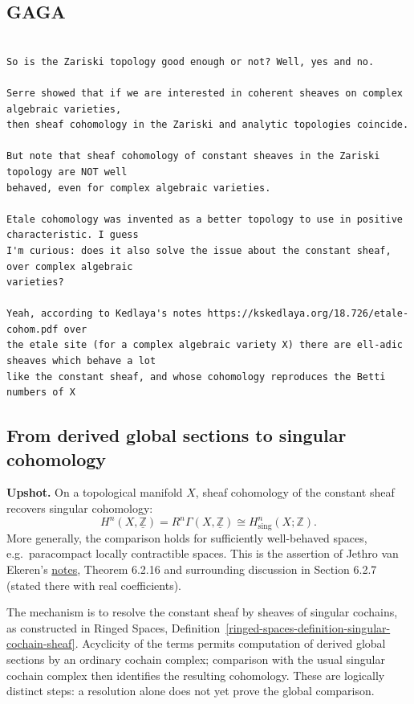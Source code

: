 \subsection{GAGA}
\label{subsection-jethro-cech-9}
\begin{Verbatim}[fontsize=\footnotesize]

So is the Zariski topology good enough or not? Well, yes and no.

Serre showed that if we are interested in coherent sheaves on complex algebraic varieties,
then sheaf cohomology in the Zariski and analytic topologies coincide.

But note that sheaf cohomology of constant sheaves in the Zariski topology are NOT well
behaved, even for complex algebraic varieties.

Etale cohomology was invented as a better topology to use in positive characteristic. I guess
I'm curious: does it also solve the issue about the constant sheaf, over complex algebraic
varieties?

Yeah, according to Kedlaya's notes https://kskedlaya.org/18.726/etale-cohom.pdf over
the etale site (for a complex algebraic variety X) there are ell-adic sheaves which behave a lot
like the constant sheaf, and whose cohomology reproduces the Betti numbers of X

\end{Verbatim}

\subsection*{From derived global sections to singular cohomology}

\noindent
{\bf Upshot.} On a topological manifold $X$,
sheaf cohomology of the constant sheaf recovers singular cohomology:
\[
H^n(X,\underline{\mathbb Z})
=R^n\Gamma(X,\underline{\mathbb Z})
\cong H^n_{\mathrm{sing}}(X;\mathbb Z).
\]
More generally, the comparison holds for sufficiently well-behaved
spaces, e.g.\ paracompact locally contractible spaces.
This is the assertion of Jethro van Ekeren's
\href{https://w3.impa.br/~jethro/2026-2/ah-current.pdf}
{notes}, Theorem 6.2.16 and surrounding discussion in
Section 6.2.7 (stated there with real coefficients).

\noindent
The mechanism is to resolve the constant sheaf by sheaves of
singular cochains, as constructed in Ringed Spaces,
Definition~\ref{ringed-spaces-definition-singular-cochain-sheaf}.
Acyclicity of the terms permits computation of derived global
sections by an ordinary cochain complex; comparison with the
usual singular cochain complex then identifies the resulting
cohomology. These are logically distinct steps: a resolution
alone does not yet prove the global comparison.



